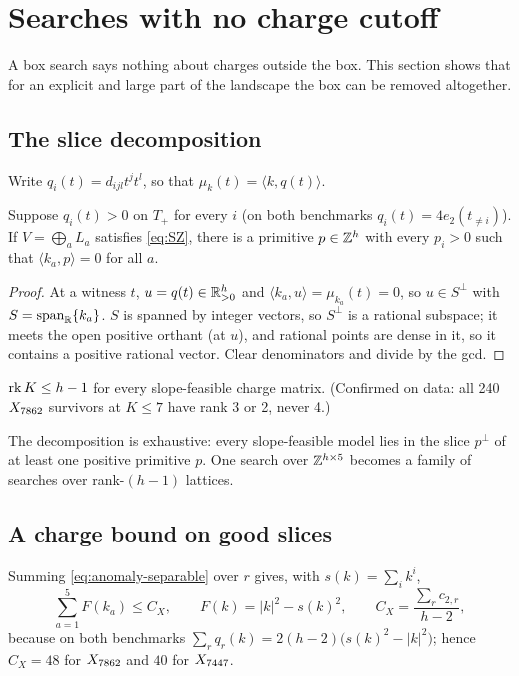 \section{Searches with no charge cutoff}
\label{sec:slices}

A box search says nothing about charges outside the box. This section shows
that for an explicit and large part of the landscape the box can be removed
altogether.

\subsection{The slice decomposition}

Write $q_i(t)=d_{ijl}t^jt^l$, so that $\mu_{k}(t)=\langle k,q(t)\rangle$.

\begin{proposition}[Slices]\label{prop:S1}
Suppose $q_i(t)>0$ on $T_+$ for every $i$ (on both benchmarks
$q_i(t)=4e_2(t_{\neq i})$). If $V=\bigoplus_aL_a$ satisfies \eqref{eq:SZ}, there is
a primitive $p\in\mathbb{Z}^h$ with every $p_i>0$ such that $\langle k_a,p\rangle=0$ for
all $a$.
\end{proposition}
\begin{proof}
At a witness $t$, $u=q(t)\in\mathbb{R}^h_{>0}$ and $\langle k_a,u\rangle=\mu_{k_a}(t)=0$,
so $u\in S^\perp$ with $S=\operatorname{span}_{\mathbb{R}}\{k_a\}$. $S$ is spanned by integer vectors, so
$S^\perp$ is a rational subspace; it meets the open positive orthant (at $u$),
and rational points are dense in it, so it contains a positive rational vector.
Clear denominators and divide by the gcd.
\end{proof}

\begin{corollary}
$\operatorname{rk} K\le h-1$ for every slope-feasible charge matrix. (Confirmed on data: all
240 $X_{7862}$ survivors at $K\le7$ have rank 3 or 2, never 4.)
\end{corollary}

The decomposition is exhaustive: every slope-feasible model lies in the slice
$p^\perp$ of at least one positive primitive $p$. One search over
$\mathbb{Z}^{h\times5}$ becomes a family of searches over rank-$(h-1)$ lattices.

\subsection{A charge bound on good slices}

Summing \eqref{eq:anomaly-separable} over $r$ gives, with $s(k)=\sum_ik^i$,
\begin{equation}\label{eq:CX}
\sum_{a=1}^5F(k_a)\le C_X,\qquad F(k)=|k|^2-s(k)^2,\qquad
C_X=\frac{\sum_rc_{2,r}}{h-2},
\end{equation}
because on both benchmarks $\sum_rq_r(k)=2(h-2)\bigl(s(k)^2-|k|^2\bigr)$; hence
$C_X=48$ for $X_{7862}$ and $40$ for $X_{7447}$.

